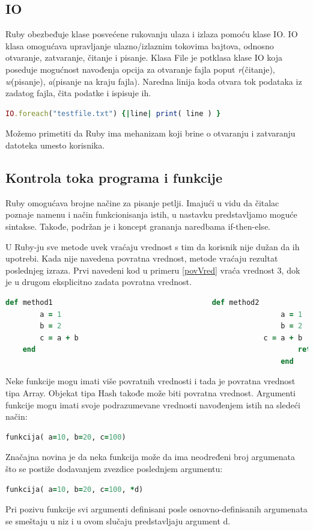 \documentclass[a4paper]{article}
\begin{document}
\subsection{IO}
Ruby obezbeđuje klase posvećene rukovanju ulaza i izlaza pomoću klase IO. IO klasa omogućava upravljanje ulazno/izlaznim tokovima bajtova, odnosno otvaranje, zatvaranje, čitanje i pisanje. Klasa File je potklasa klase IO koja poseduje mogućnost navođenja opcija za otvaranje fajla poput \emph{r}(čitanje), \emph{w}(pisanje), \emph{a}(pisanje na kraju fajla). Naredna linija koda otvara tok podataka iz zadatog fajla, čita podatke i ispisuje ih.
\begin{lstlisting}[language=Ruby]
	 IO.foreach("testfile.txt") {|line| print( line ) }
\end{lstlisting}\vspace*{-15pt}

Možemo primetiti da Ruby ima mehanizam koji brine o otvaranju i zatvaranju datoteka umesto korisnika. 

\subsection{Kontrola toka programa i funkcije}
Ruby omogućava brojne načine za pisanje petlji. Imajući u vidu da čitalac poznaje namenu i način funkcionisanja istih, u nastavku predstavljamo moguće sintakse. Takođe, podržan je i koncept grananja naredbama if-then-else.


U Ruby-ju sve metode uvek vraćaju vrednost s tim da korisnik nije dužan da ih upotrebi. Kada nije navedena povratna vrednost, metode vraćaju rezultat poslednjeg izraza. Prvi navedeni kod u primeru \ref{povVred} vraća vrednost 3, dok je u drugom eksplicitno zadata povratna vrednost.

\begin{lstlisting}[language=Ruby, caption={Primer koda}, frame=single, label=povVred]
	def method1 									def method2
		a = 1													a = 1
		b = 2													b = 2
		c = a + b											c = a + b
	end 															return b
																end
\end{lstlisting}

Neke funkcije mogu imati više povratnih vrednosti i tada je povratna vrednost tipa Array. Objekat tipa Hash takođe može biti povratna vrednost. Argumenti funkcije mogu imati svoje podrazumevane vrednosti navođenjem istih na sledeći način:
\begin{lstlisting}[language=Ruby]
	funkcija( a=10, b=20, c=100)
\end{lstlisting}\vspace*{-15pt}
Značajna novina je da neka funkcija može da ima neodređeni broj argumenata što se postiže dodavanjem zvezdice poslednjem argumentu:
\begin{lstlisting}[language=Ruby]
	funkcija( a=10, b=20, c=100, *d)
\end{lstlisting}\vspace*{-15pt}
Pri pozivu funkcije svi argumenti definisani posle osnovno-definisanih argumenata se smeštaju u niz i u ovom slučaju predstavljaju argument d.
\end{document}
